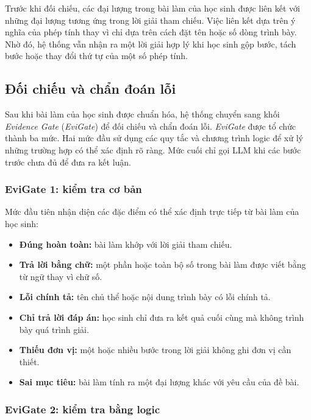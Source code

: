 \documentclass[12pt,a4paper]{article}
\begin{document}
Trước khi đối chiếu, các đại lượng trong bài làm của học sinh được liên kết với
những đại lượng tương ứng trong lời giải tham chiếu. Việc liên kết dựa trên ý
nghĩa của phép tính thay vì chỉ dựa trên cách đặt tên hoặc số dòng trình bày.
Nhờ đó, hệ thống vẫn nhận ra một lời giải hợp lý khi học sinh gộp bước, tách
bước hoặc thay đổi thứ tự của một số phép tính.

\subsection{Đối chiếu và chẩn đoán lỗi}

Sau khi bài làm của học sinh được chuẩn hóa, hệ thống chuyển sang khối
\textit{Evidence Gate} (\textit{EviGate}) để đối chiếu và chẩn đoán lỗi.
\textit{EviGate} được tổ chức thành ba mức. Hai mức đầu sử dụng các quy tắc và
chương trình logic để xử lý những trường hợp có thể xác định rõ ràng. Mức cuối
chỉ gọi LLM khi các bước trước chưa đủ để đưa ra kết luận.

\subsubsection{EviGate 1: kiểm tra cơ bản}

Mức đầu tiên nhận diện các đặc điểm có thể xác định trực tiếp từ bài làm của
học sinh:

\begin{itemize}[leftmargin=*]
    \item \textbf{Đúng hoàn toàn:} bài làm khớp với lời giải tham chiếu.
    \item \textbf{Trả lời bằng chữ:} một phần hoặc toàn bộ số trong bài làm được
    viết bằng từ ngữ thay vì chữ số.
    \item \textbf{Lỗi chính tả:} tên chủ thể hoặc nội dung trình bày có lỗi chính
    tả.
    \item \textbf{Chỉ trả lời đáp án:} học sinh chỉ đưa ra kết quả cuối cùng mà
    không trình bày quá trình giải.
    \item \textbf{Thiếu đơn vị:} một hoặc nhiều bước trong lời giải không ghi
    đơn vị cần thiết.
    \item \textbf{Sai mục tiêu:} bài làm tính ra một đại lượng khác với yêu cầu
    của đề bài.
\end{itemize}

\subsubsection{EviGate 2: kiểm tra bằng logic}
\end{document}
